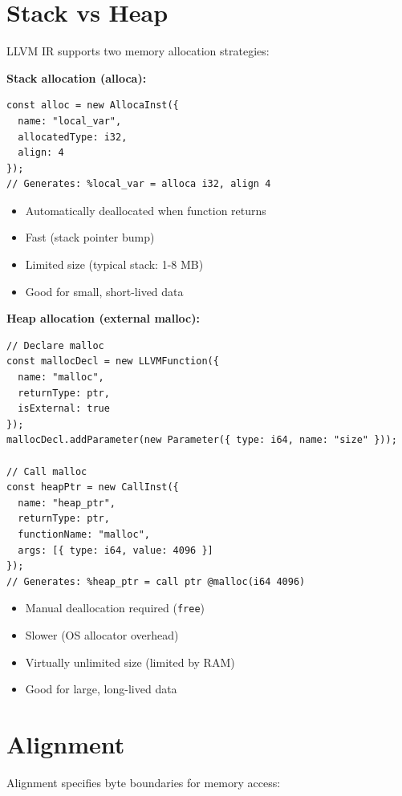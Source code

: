 \documentclass[11pt,oneside]{book}
\begin{document}
\section{Stack vs Heap}

LLVM IR supports two memory allocation strategies:

\textbf{Stack allocation (alloca):}
\begin{lstlisting}[style=ts]
const alloc = new AllocaInst({
  name: "local_var",
  allocatedType: i32,
  align: 4
});
// Generates: %local_var = alloca i32, align 4
\end{lstlisting}

\begin{itemize}[noitemsep]
  \item Automatically deallocated when function returns
  \item Fast (stack pointer bump)
  \item Limited size (typical stack: 1-8 MB)
  \item Good for small, short-lived data
\end{itemize}

\textbf{Heap allocation (external malloc):}
\begin{lstlisting}[style=ts]
// Declare malloc
const mallocDecl = new LLVMFunction({
  name: "malloc",
  returnType: ptr,
  isExternal: true
});
mallocDecl.addParameter(new Parameter({ type: i64, name: "size" }));

// Call malloc
const heapPtr = new CallInst({
  name: "heap_ptr",
  returnType: ptr,
  functionName: "malloc",
  args: [{ type: i64, value: 4096 }]
});
// Generates: %heap_ptr = call ptr @malloc(i64 4096)
\end{lstlisting}

\begin{itemize}[noitemsep]
  \item Manual deallocation required (\texttt{free})
  \item Slower (OS allocator overhead)
  \item Virtually unlimited size (limited by RAM)
  \item Good for large, long-lived data
\end{itemize}

\section{Alignment}

Alignment specifies byte boundaries for memory access:
\end{document}
